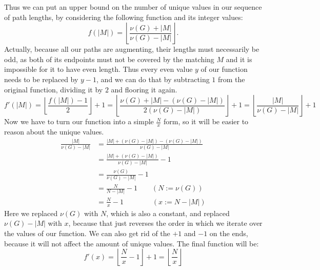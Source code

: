 \documentclass{article}
\begin{document}
  Thus we can put an upper bound on the number of unique values in our sequence of path lengths, by considering the following function and its integer values:
  $$f(|M|) = \left\lfloor\frac{\nu(G)+|M|}{\nu(G)-|M|}\right\rfloor.$$
  Actually, because all our paths are augmenting, their lengths must necessarily be odd, as both of its endpoints must not be covered by the matching $M$ and it is impossible for it to have even length.
  Thus every even value $y$ of our function needs to be replaced by $y-1$, and we can do that by subtracting $1$ from the original function, dividing it by $2$ and flooring it again.
  \[ f'(|M|) = \left\lfloor\frac{f(|M|)-1}{2}\right\rfloor+1
    = \left\lfloor\frac{\nu(G)+|M|-(\nu(G)-|M|)}{2(\nu(G)-|M|)}\right\rfloor+1
    = \left\lfloor\frac{|M|}{\nu(G)-|M|}\right\rfloor+1 \]
  Now we have to turn our function into a simple $\frac{N}{x}$ form, so it will be easier to reason about the unique values.
  \begin{align*}
    \frac{|M|}{\nu(G)-|M|} &= \frac{|M| + (\nu(G)-|M|) - (\nu(G)-|M|)}{\nu(G)-|M|} \\
    &= \frac{|M| + (\nu(G)-|M|)}{\nu(G)-|M|} - 1 \\
    &= \frac{\nu(G)}{\nu(G)-|M|} - 1 \\
    &= \frac{N}{N-|M|} - 1 \qquad (N := \nu(G)) \\
    &= \frac{N}{x} - 1 \qquad\qquad (x := N-|M|)
  \end{align*}
  Here we replaced $\nu(G)$ with $N$, which is also a constant, and replaced $\nu(G)-|M|$ with $x$, because that just reverses the order in which we iterate over the values of our function.
  We can also get rid of the $+1$ and $-1$ on the ends, because it will not affect the amount of unique values.
  The final function will be:
  \[ f'(x) = \left\lfloor\frac{N}{x} - 1\right\rfloor+1 = \left\lfloor\frac{N}{x}\right\rfloor \]
\end{document}
